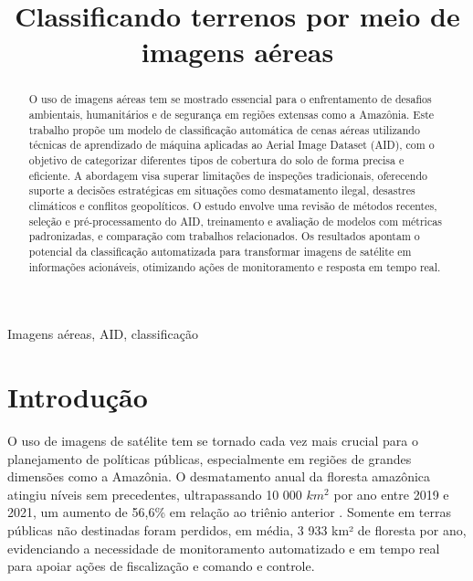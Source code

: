 \documentclass[conference]{IEEEtran}
\begin{document}
\title{Classificando terrenos por meio de imagens aéreas}


\author{
\and
{}

}

\maketitle

\begin{abstract}
O uso de imagens aéreas tem se mostrado essencial para o enfrentamento de desafios ambientais, humanitários e de segurança em regiões extensas como a Amazônia. Este trabalho propõe um modelo de classificação automática de cenas aéreas utilizando técnicas de aprendizado de máquina aplicadas ao Aerial Image Dataset (AID), com o objetivo de categorizar diferentes tipos de cobertura do solo de forma precisa e eficiente. A abordagem visa superar limitações de inspeções tradicionais, oferecendo suporte a decisões estratégicas em situações como desmatamento ilegal, desastres climáticos e conflitos geopolíticos. O estudo envolve uma revisão de métodos recentes, seleção e pré-processamento do AID, treinamento e avaliação de modelos com métricas padronizadas, e comparação com trabalhos relacionados. Os resultados apontam o potencial da classificação automatizada para transformar imagens de satélite em informações acionáveis, otimizando ações de monitoramento e resposta em tempo real.
\end{abstract}

\begin{IEEEkeywords}
Imagens aéreas, AID, classificação
\end{IEEEkeywords}

\section{Introdução}
    O uso de imagens de satélite tem se tornado cada vez mais crucial para o planejamento de políticas públicas, especialmente em regiões de grandes dimensões como a Amazônia. O desmatamento anual da floresta amazônica atingiu níveis sem precedentes, ultrapassando 10 000 \(km^{2}\) por ano entre 2019 e 2021, um aumento de 56,6\% em relação ao triênio anterior \cite{ipam2022}. Somente em terras públicas não destinadas foram perdidos, em média, 3 933 km² de floresta por ano, evidenciando a necessidade de monitoramento automatizado e em tempo real para apoiar ações de fiscalização e comando e controle.
\end{document}
